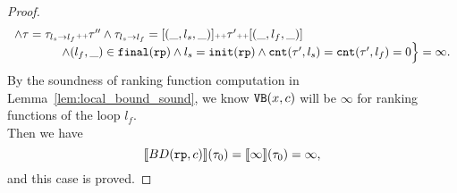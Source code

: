 \begin{proof}
\[\begin{array}{l}
    \land \mathtt{\tau} = \mathtt{\tau}_{l_s \to l_f} {\scriptscriptstyle ++} \mathtt{\tau}''
    \land \mathtt{\tau}_{l_s \to l_f} = [(\_, l_s, \_)] {\scriptscriptstyle ++} \mathtt{\tau}' {\scriptscriptstyle ++} [(\_, l_f, \_)]
    \\ \qquad \qquad
  \land (l_{f}, \_) \in \mathtt{final}(\mathtt{rp})
  \land l_s = \mathtt{init}(\mathtt{rp})
  \land \mathtt{cnt}(\mathtt{\tau}', l_s) = \mathtt{cnt}(\mathtt{\tau}', l_f) = 0 
  \Big\} = \infty.
  \end{array}
\]
By the soundness of ranking function computation in Lemma~\ref{lem:local_bound_sound}, we know ${\mathtt{VB}}(x, c)$ will be $\infty$ for ranking functions of the loop $l_f$.
\\
Then we have 
\[
  \llbracket BD(\mathtt{rp}, c) \rrbracket(\mathtt{\tau}_0) = \llbracket \infty \rrbracket(\mathtt{\tau}_0) = \infty,
\]
and this case is proved.
\end{proof}